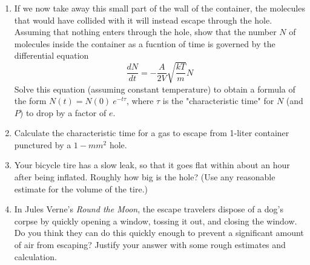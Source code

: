 \documentclass[fleqn]{article}
\begin{document}
\begin{enumerate}
\begin{enumerate}
        \item If we now take away this small part of the wall of the container, the molecules that would have collided with it will 
        instead escape through the hole. Assuming that nothing enters through the hole, show that the number $N$ of molecules inside
        the container as a fucntion of time is governed by the differential equation
        $$
          \dfrac{dN}{dt}=-\dfrac{A}{2V} \sqrt{\dfrac{kT}{m}} N
        $$
        Solve this equation (assuming constant temperature) to obtain a formula of the form $N(t)=N(0) ~ e^{-t\tau}$, where $\tau$
        is the "characteristic time" for $N$ (and $P$) to drop by a factor of $e$.


        \item Calculate the characteristic time for a gas to escape from 1-liter container punctured by a $1-mm^2$ hole.
        

        \item Your bicycle tire has a slow leak, so that it goes flat within about an hour after being inflated. Roughly how big is the 
        hole? (Use any reasonable estimate for the volume of the tire.)


        \item In Jules Verne's \emph{Round the Moon}, the escape travelers dispose of a dog's corpse by quickly opening a window,
        tossing it out, and closing the window. Do you think they can do this quickly enough to prevent a significant amount of air
        from escaping? Justify your answer with some rough estimates and calculation.


      \end{enumerate}

  \end{enumerate}
\end{document}
